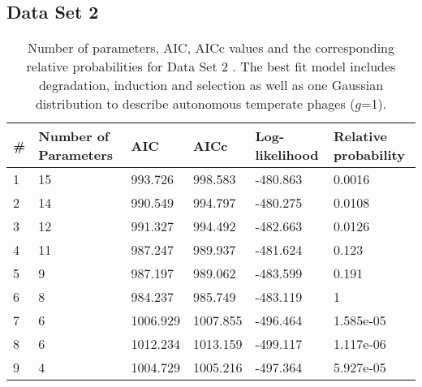 \subsection{Data Set 2}
\begin{table}[hbt!]
\centering
\begin{tabular}{ p{1cm}p{2cm}p{2cm}p{2cm}p{2cm}p{2cm}  }
\hline
\# & Number of Parameters & AIC & AICc& Log-likelihood  & Relative probability \\
\hline
1&                         15&          993.726&          998.583&         -480.863&       0.0016\\
2&                        14&          990.549&          994.797&         -480.275&        0.0108\\
3&                        12&          991.327&          994.492&         -482.663&         0.0126\\
4&                        11&           987.247&          989.937&         -481.624&         0.123\\
5&                         9&          987.197&          989.062&          -483.599&         0.191\\
6&                         8&          984.237&          985.749&         -483.119&          1\\
7&                         6&          1006.929&          1007.855&         -496.464&      1.585e-05\\
8&                         6&          1012.234&          1013.159&         -499.117&       1.117e-06\\
9&                         4&          1004.729&          1005.216&         -497.364&      5.927e-05\\
\hline
\end{tabular}
\caption[Number of parameters, AIC, AICc values and the corresponding relative probabilities for Data Set 2.]{Number of parameters, AIC, AICc values and the corresponding relative probabilities for Data Set 2 \citep{crispim_screening_2018}. The best fit model includes degradation, induction and selection as well as one Gaussian distribution to describe autonomous temperate phages ($g$=1).}
\label{table:desu}
\end{table}
\newpage
